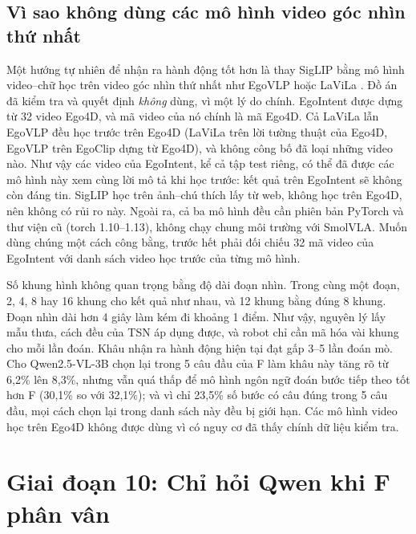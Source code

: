 \documentclass[a4paper,oneside]{report}
\begin{document}
\subsection{Vì sao không dùng các mô hình video góc nhìn thứ nhất}
\label{sec:stage9d}

Một hướng tự nhiên để nhận ra hành động tốt hơn là thay SigLIP bằng mô hình video--chữ học trên video góc nhìn thứ nhất như EgoVLP \citep{lin2022egovlp} hoặc LaViLa \citep{zhao2023lavila}. Đồ án đã kiểm tra và quyết định \textit{không} dùng, vì một lý do chính. EgoIntent được dựng từ 32 video Ego4D, và mã video của nó chính là mã Ego4D. Cả LaViLa lẫn EgoVLP đều học trước trên Ego4D (LaViLa trên lời tường thuật của Ego4D, EgoVLP trên EgoClip dựng từ Ego4D), và không công bố đã loại những video nào. Như vậy các video của EgoIntent, kể cả tập test riêng, có thể đã được các mô hình này xem cùng lời mô tả khi học trước: kết quả trên EgoIntent sẽ không còn đáng tin. SigLIP học trên ảnh--chú thích lấy từ web, không học trên Ego4D, nên không có rủi ro này. Ngoài ra, cả ba mô hình đều cần phiên bản PyTorch và thư viện cũ (torch 1.10--1.13), không chạy chung môi trường với SmolVLA. Muốn dùng chúng một cách công bằng, trước hết phải đối chiếu 32 mã video của EgoIntent với danh sách video học trước của từng mô hình.

\begin{ketqua}
Số khung hình không quan trọng bằng độ dài đoạn nhìn. Trong cùng một đoạn, 2, 4, 8 hay 16 khung cho kết quả như nhau, và 12 khung bằng đúng 8 khung. Đoạn nhìn dài hơn 4 giây làm kém đi khoảng 1 điểm. Như vậy, nguyên lý lấy mẫu thưa, cách đều của TSN áp dụng được, và robot chỉ cần mã hóa vài khung cho mỗi lần đoán. Khâu nhận ra hành động hiện tại đạt gấp 3--5 lần đoán mò. Cho Qwen2.5-VL-3B chọn lại trong 5 câu đầu của F làm khâu này tăng rõ từ 6,2\% lên 8,3\%, nhưng vẫn quá thấp để mô hình ngôn ngữ đoán bước tiếp theo tốt hơn F (30,1\% so với 32,1\%); và vì chỉ 23,5\% số bước có câu đúng trong 5 câu đầu, mọi cách chọn lại trong danh sách này đều bị giới hạn. Các mô hình video học trên Ego4D không được dùng vì có nguy cơ đã thấy chính dữ liệu kiểm tra.
\end{ketqua}

\section{Giai đoạn 10: Chỉ hỏi Qwen khi F phân vân}
\label{sec:stage10}
\end{document}
